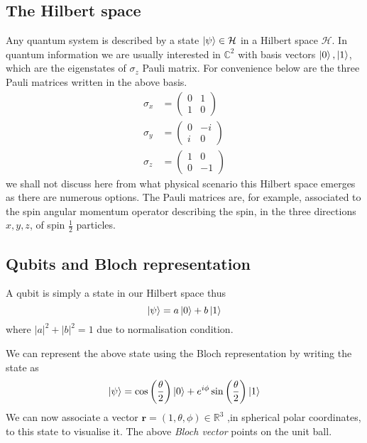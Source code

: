 \documentclass{physics_article}
\begin{document}
	\subsection{The Hilbert space}
	Any quantum system is described by a state $\ket{\psi} \in \mathcal{H}$ in a Hilbert space $\mathcal{H}$. In quantum information we are usually interested in $\mathbb{C}^2$ with basis vectors ${\ket{0},\ket{1}}$, which are the eigenstates of $\sigma_z$ Pauli matrix. For convenience below are the three Pauli matrices written in the above basis.
	\begin{align}
	\sigma_x &= \begin{pmatrix}
	 	0&1\\
	 	1&0
	 \end{pmatrix}\\
	 \sigma_y &= \begin{pmatrix}
	 	0&-i\\
	 	i&0
	 \end{pmatrix}\\
	 \sigma_z &= \begin{pmatrix}
	 	1&0\\
	 	0&-1
	 \end{pmatrix}
 	\end{align}
 	we shall not discuss here from what physical scenario this Hilbert space emerges as there are numerous options. The Pauli matrices are, for example, associated to the spin angular momentum operator describing the spin, in the three directions $x,y,z$, of spin $\frac{1}{2}$ particles\cite{nielsen_chuang_2021}.

 	\subsection{Qubits and Bloch representation}
 	A qubit is simply a state in our Hilbert space thus
 	\begin{equation}
 		\ket{\psi} = a\ket{0} + b\ket{1}
 	\end{equation}
 	where $|a|^2+|b|^2 = 1$ due to normalisation condition.

 	We can represent the above state using the Bloch representation\cite{nielsen_chuang_2021} by writing the state as
 	\begin{equation}
 		\ket{\psi} = \cos\left(\frac{\theta}{2}\right)\ket{0} + e^{i\phi}\sin\left(\frac{\theta}{2}\right)\ket{1}
 	\end{equation}
 	We can now associate a vector $\bm{r} = (1,\theta,\phi)\in\mathbb{R}^3$ ,in spherical polar coordinates, to this state to visualise it. The above \emph{Bloch vector} points on the unit ball.



 	
 	
\end{document}
